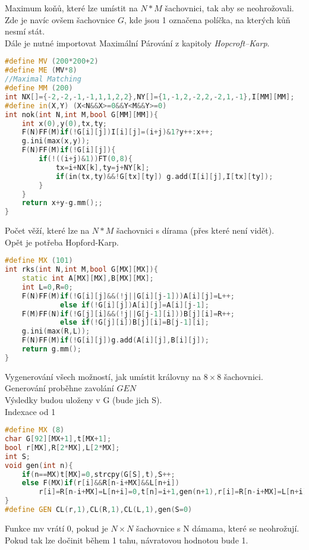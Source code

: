 \documentclass[11pt]{article}
\begin{document}
Maximum koňů, které lze umístit na $N*M$ šachovnici, tak aby se neohrožovali.
\\Zde je navíc ovšem šachovnice $G$, kde jsou 1 označena políčka, na kterých kůň nesmí stát.
\\Dále je nutné importovat Maximální Párování z kapitoly \textit{Hopcroft–Karp}.
\begin{lstlisting}[language=C++]
#define MV (200*200+2)
#define ME (MV*8)
//Maximal Matching
#define MM (200)
int NX[]={-2,-2,-1,-1,1,1,2,2},NY[]={1,-1,2,-2,2,-2,1,-1},I[MM][MM];
#define in(X,Y) (X<N&&X>=0&&Y<M&&Y>=0)
int nok(int N,int M,bool G[MM][MM]){
    int x(0),y(0),tx,ty;
    F(N)FF(M)if(!G[i][j])I[i][j]=(i+j)&1?y++:x++;
    g.ini(max(x,y));
    F(N)FF(M)if(!G[i][j]){
        if(!((i+j)&1))FT(0,8){
            tx=i+NX[k],ty=j+NY[k];
            if(in(tx,ty)&&!G[tx][ty]) g.add(I[i][j],I[tx][ty]);
        }
    }
    return x+y-g.mm();;
}
\end{lstlisting}
Počet věží, které lze na $N*M$ šachovnici s dírama (přes které není vidět).
\\Opět je potřeba Hopford-Karp.
\begin{lstlisting}[language=C++]
#define MX (101)
int rks(int N,int M,bool G[MX][MX]){
    static int A[MX][MX],B[MX][MX];
    int L=0,R=0;
    F(N)FF(M)if(!G[i][j]&&(!j||G[i][j-1]))A[i][j]=L++;
             else if(!G[i][j])A[i][j]=A[i][j-1];
    F(M)FF(N)if(!G[j][i]&&(!j||G[j-1][i]))B[j][i]=R++;
             else if(!G[j][i])B[j][i]=B[j-1][i];
    g.ini(max(R,L));
    F(N)FF(M)if(!G[i][j])g.add(A[i][j],B[i][j]);
    return g.mm();
}
\end{lstlisting}
Vygenerování všech možností, jak umístit královny na $8\times 8$ šachovnici.
\\Generování proběhne zavolání $GEN$
\\Výsledky budou uloženy v \textsf{G} (bude jich \textsf{S}).
\\Indexace od 1
\begin{lstlisting}[language=C++]
#define MX (8)
char G[92][MX+1],t[MX+1];
bool r[MX],R[2*MX],L[2*MX];
int S;
void gen(int n){
    if(n==MX)t[MX]=0,strcpy(G[S],t),S++;
    else F(MX)if(r[i]&&R[n-i+MX]&&L[n+i])
        r[i]=R[n-i+MX]=L[n+i]=0,t[n]=i+1,gen(n+1),r[i]=R[n-i+MX]=L[n+i]=1;
}
#define GEN CL(r,1),CL(R,1),CL(L,1),gen(S=0)
\end{lstlisting}
Funkce \textsf{mv} vrátí 0, pokud je $N\times N$ šachovnice s \textsf{N} dámama, které se neohrožují. \\Pokud tak lze dočinit během 1 tahu, návratovou hodnotou bude 1. 
\end{document}
